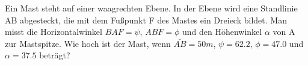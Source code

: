 
Ein Mast steht auf einer waagrechten Ebene. In der Ebene wird eine Standlinie AB abgesteckt,
die mit dem Fußpunkt F des Mastes ein Dreieck bildet. Man misst die
Horizontalwinkel $BAF = \psi$, $ABF = \phi$ und den Höhenwinkel $\alpha$ von A zur Mastspitze.
Wie hoch ist der Mast, wenn $\bar{AB} = 50m$, $\psi = 62.2$, $\phi = 47.0$ und $\alpha = 37.5$
beträgt?
